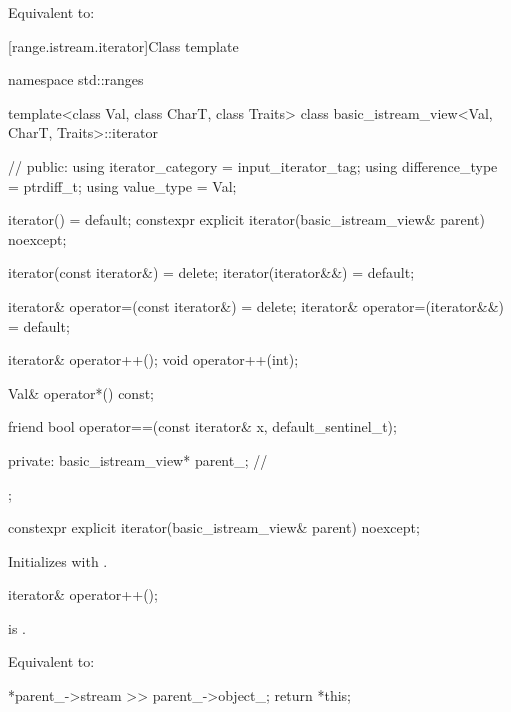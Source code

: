 \begin{itemdescr}
\pnum
\effects
Equivalent to: 
\end{itemdescr}

[range.istream.iterator]{Class template }

%
\begin{codeblock}
namespace std::ranges {
  template<class Val, class CharT, class Traits>
  class basic_istream_view<Val, CharT, Traits>::iterator {      // \expos
  public:
    using iterator_category = input_iterator_tag;
    using difference_type = ptrdiff_t;
    using value_type = Val;

    iterator() = default;
    constexpr explicit iterator(basic_istream_view& parent) noexcept;

    iterator(const iterator&) = delete;
    iterator(iterator&&) = default;

    iterator& operator=(const iterator&) = delete;
    iterator& operator=(iterator&&) = default;

    iterator& operator++();
    void operator++(int);

    Val& operator*() const;

    friend bool operator==(const iterator& x, default_sentinel_t);

  private:
    basic_istream_view* parent_{};                              // \expos
  };
}
\end{codeblock}

%
\begin{itemdecl}
constexpr explicit iterator(basic_istream_view& parent) noexcept;
\end{itemdecl}

\begin{itemdescr}
\pnum
\effects
Initializes  with .
\end{itemdescr}

%
\begin{itemdecl}
iterator& operator++();
\end{itemdecl}

\begin{itemdescr}
\pnum
\expects
{} is .

\pnum
\effects
Equivalent to:
\begin{codeblock}
*parent_->stream >> parent_->object_;
return *this;
\end{codeblock}
\end{itemdescr}


